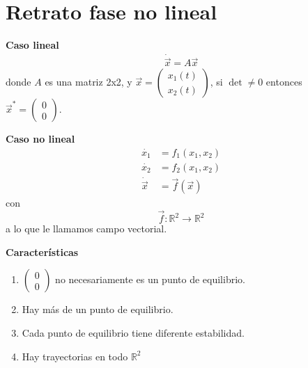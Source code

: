\section{Retrato fase no lineal}

\begin{tcolorbox}[colback=Black!4, colframe=White, arc = 0mm]
\textbf{Caso lineal}
$$
\begin{aligned}
  \dot{\vec{x}}=A \vec{x} 
\end{aligned}
$$
donde $A$ es una matriz 2x2, y $\vec{x} = \begin{pmatrix} x_1(t) \\ x_2(t) \end{pmatrix} $, si $\operatorname{det} \neq 0 $ entonces $\vec{x}^*=\begin{pmatrix} 0 \\ 0 \end{pmatrix}. $  
\end{tcolorbox}

\begin{tcolorbox}[colback=Black!4, colframe=White, arc = 0mm]
\textbf{Caso no lineal}
 $$
\begin{aligned}
  \dot{x_1} &= f_1(x_1,x_2) \\ 
  \dot{x_2} &= f_2(x_1,x_2) \\ 
  \dot{\vec{x}}&=\vec{f}(\vec{x})
\end{aligned}
$$
con $$
 \vec{f}: \mathbb{R}^2 \to \mathbb{R}^2
$$
a lo que le llamamos campo vectorial.

  \textbf{Características}

  \begin{enumerate}
    \item  $\begin{pmatrix} 0 \\ 0 \end{pmatrix} $ no necesariamente es un punto de equilibrio.
      \item Hay más de un punto de equilibrio.
	\item Cada punto de equilibrio tiene diferente estabilidad.
	  \item Hay trayectorias en todo $\mathbb{R}^2$
  \end{enumerate} 
\end{tcolorbox}

